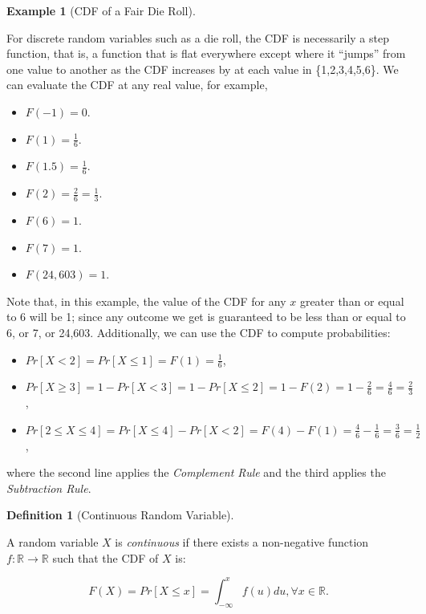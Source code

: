 \documentclass[
]{article}
\providecommand{\tightlist}{%
  \setlength{\itemsep}{0pt}\setlength{\parskip}{0pt}}
\theoremstyle{definition}
\newtheorem{definition}{Definition}[section]
\theoremstyle{definition}
\newtheorem{example}{Example}[section]
\theoremstyle{definition}
\theoremstyle{remark}
\begin{document}
\begin{example}[CDF of a Fair Die Roll]
\protect\hypertarget{exm:unlabeled-div-30}{}\label{exm:unlabeled-div-30}

For discrete random variables such as a die roll, the CDF is necessarily a step function, that is, a function that is flat everywhere except where it ``jumps'' from one value to another as the CDF increases by  at each value in \{1,2,3,4,5,6\}. We can evaluate the CDF at any real value, for example,

\begin{itemize}
\tightlist
\item
  \(F(-1) = 0\).
\item
  \(F(1) = \frac{1}{6}\).
\item
  \(F(1.5) = \frac{1}{6}\).
\item
  \(F(2) = \frac{2}{6} = \frac{1}{3}\).
\item
  \(F(6) = 1\).
\item
  \(F(7) = 1\).
\item
  \(F(24,603) = 1\).
\end{itemize}

Note that, in this example, the value of the CDF for any \(x\) greater than or equal to 6 will be 1; since any outcome we get is guaranteed to be less than or equal to 6, or 7, or 24,603. Additionally, we can use the CDF to compute probabilities:

\begin{itemize}
\tightlist
\item
  \(Pr[X < 2] = Pr[X \leq 1] = F(1) = \frac{1}{6}\),
\item
  \(Pr[X \geq 3] = 1- Pr[X < 3] = 1- Pr[X \leq 2] = 1 - F(2) = 1 - \frac{2}{6} = \frac{4}{6} = \frac{2}{3}\),
\item
  \(Pr[2 \leq X \leq 4] = Pr[X \leq 4] - Pr[X < 2] = F(4) - F(1) = \frac{4}{6} - \frac{1}{6} = \frac{3}{6} = \frac{1}{2}\),
\end{itemize}

where the second line applies the \emph{Complement Rule} and the third applies the \emph{Subtraction Rule}.

\end{example}

\begin{definition}[Continuous Random Variable]
\protect\hypertarget{def:unlabeled-div-31}{}\label{def:unlabeled-div-31}

A random variable \(X\) is \emph{continuous} if there exists a non-negative function \(f: \mathbb{R} \to \mathbb{R}\) such that the CDF of \(X\) is:

\[F(X) = Pr[X \leq x] = \int_{-\infty}^x f(u)du, \forall x \in \mathbb{R}.\]

\end{definition}
\end{document}
